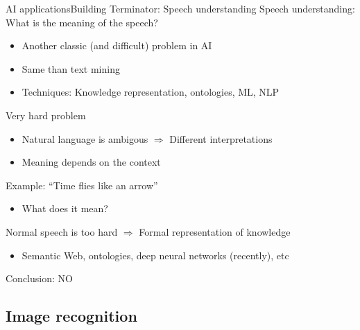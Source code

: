 \documentclass[10pt,compress]{beamer} %
\begin{document}
\begin{frame}{AI applications}{Building Terminator: Speech understanding}
	Speech understanding: What is the meaning of the speech?
	\begin{itemize}
		\item Another classic (and difficult) problem in AI
		\item Same than text mining
		\item Techniques: Knowledge representation, ontologies, ML, NLP
	\end{itemize}
	Very hard problem
	\begin{itemize}
		\item Natural language is ambigous $\Rightarrow$ Different interpretations 
		\item Meaning depends on the context
	\end{itemize}
	Example: ``Time flies like an arrow''
	\begin{itemize}
		\item What does it mean?
	\end{itemize}
	Normal speech is too hard $\Rightarrow$ Formal representation of knowledge
	\begin{itemize}
		\item Semantic Web, ontologies, deep neural networks (recently), etc
	\end{itemize}
	Conclusion: NO
\end{frame}

\subsection{Image recognition}
\end{document}
